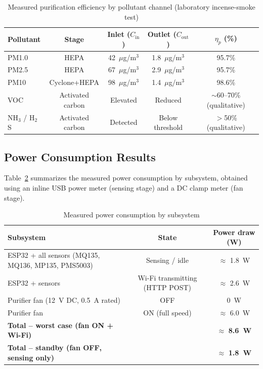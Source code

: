 \begin{table}[htbp]
\centering
\caption{Measured purification efficiency by pollutant channel (laboratory incense-smoke test)}
\label{tab:exp-purification-efficiency}
\small
\begin{tabular}{@{}lcccc@{}}
\toprule
\textbf{Pollutant} & \textbf{Stage} & \textbf{Inlet ($C_{\mathrm{in}}$)} & \textbf{Outlet ($C_{\mathrm{out}}$)} & \textbf{$\eta_p$ (\%)} \\
\midrule
PM1.0  & HEPA       & 42~$\mu$g/m$^3$ & 1.8~$\mu$g/m$^3$ & 95.7\% \\
PM2.5  & HEPA       & 67~$\mu$g/m$^3$ & 2.9~$\mu$g/m$^3$ & 95.7\% \\
PM10   & Cyclone+HEPA & 98~$\mu$g/m$^3$ & 1.4~$\mu$g/m$^3$ & 98.6\% \\
VOC    & Activated carbon & Elevated & Reduced & $\sim$60--70\% (qualitative) \\
NH$_3$ / H$_2$S & Activated carbon & Detected & Below threshold & $>$50\% (qualitative) \\
\bottomrule
\end{tabular}
\end{table}

\subsection{Power Consumption Results}
\label{sec:exp-power-result}

Table~\ref{tab:exp-power} summarizes the measured power consumption by subsystem, obtained using an inline USB power meter (sensing stage) and a DC clamp meter (fan stage).

\begin{table}[htbp]
\centering
\caption{Measured power consumption by subsystem}
\label{tab:exp-power}
\begin{tabular}{@{}lcc@{}}
\toprule
\textbf{Subsystem} & \textbf{State} & \textbf{Power draw (W)} \\
\midrule
ESP32 + all sensors (MQ135, MQ136, MP135, PMS5003) & Sensing / idle    & $\approx$ 1.8~W \\
ESP32 + sensors & Wi-Fi transmitting (HTTP POST) & $\approx$ 2.6~W \\
Purifier fan (12~V DC, 0.5~A rated) & OFF & 0~W \\
Purifier fan & ON (full speed) & $\approx$ 6.0~W \\
\midrule
\textbf{Total -- worst case (fan ON + Wi-Fi)} & & $\approx$ \textbf{8.6~W} \\
\textbf{Total -- standby (fan OFF, sensing only)} & & $\approx$ \textbf{1.8~W} \\
\bottomrule
\end{tabular}
\end{table}

